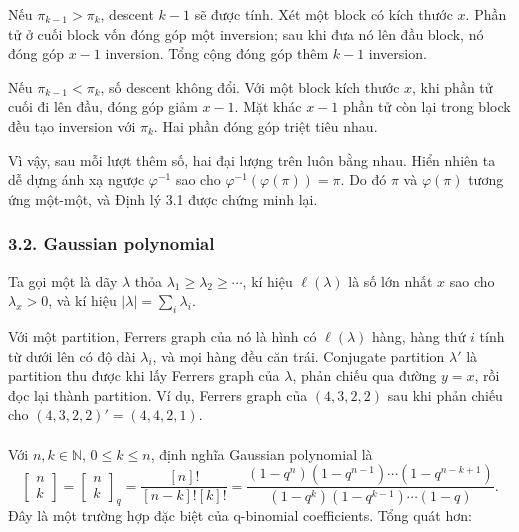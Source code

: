\documentclass[11pt]{article}
\begin{document}
Nếu \(\pi_{k-1}>\pi_k\), descent \(k-1\) sẽ được tính. Xét một block có kích
thước \(x\). Phần tử ở cuối block vốn đóng góp một inversion; sau khi đưa nó
lên đầu block, nó đóng góp \(x-1\) inversion. Tổng cộng đóng góp thêm
\(k-1\) inversion.

Nếu \(\pi_{k-1}<\pi_k\), số descent không đổi. Với một block kích thước \(x\),
khi phần tử cuối đi lên đầu, đóng góp giảm \(x-1\). Mặt khác \(x-1\) phần tử
còn lại trong block đều tạo inversion với \(\pi_k\). Hai phần đóng góp triệt
tiêu nhau.

Vì vậy, sau mỗi lượt thêm số, hai đại lượng trên luôn bằng nhau. Hiển nhiên
ta dễ dựng ánh xạ ngược \(\varphi^{-1}\) sao cho
\(\varphi^{-1}(\varphi(\pi))=\pi\). Do đó \(\pi\) và \(\varphi(\pi)\) tương
ứng một-một, và Định lý 3.1 được chứng minh lại.

\subsubsection*{3.2. Gaussian polynomial}

Ta gọi một  là dãy \(\lambda\) thỏa
\(\lambda_1\ge\lambda_2\ge\cdots\), kí hiệu \(\ell(\lambda)\) là số lớn nhất
\(x\) sao cho \(\lambda_x>0\), và kí hiệu
\(|\lambda|=\sum_i\lambda_i\).

Với một partition, Ferrers graph của nó là hình có \(\ell(\lambda)\) hàng, hàng
thứ \(i\) tính từ dưới lên có độ dài \(\lambda_i\), và mọi hàng đều căn trái.
Conjugate partition \(\lambda'\) là partition thu được khi lấy Ferrers graph
của \(\lambda\), phản chiếu qua đường \(y=x\), rồi đọc lại thành partition.
Ví dụ, Ferrers graph của \((4,3,2,2)\) sau khi phản chiếu cho
\((4,3,2,2)'=(4,4,2,1)\).


\paragraph{}
Với \(n,k\in\mathbb N\), \(0\le k\le n\), định nghĩa Gaussian polynomial là
\[
  \left[\begin{matrix} n\\ k \end{matrix}\right]
  =\left[\begin{matrix} n\\ k \end{matrix}\right]_q
  =\frac{[n]!}{[n-k]![k]!}
  =\frac{(1-q^n)(1-q^{n-1})\cdots(1-q^{n-k+1})}
         {(1-q^k)(1-q^{k-1})\cdots(1-q)}.
\]
Đây là một trường hợp đặc biệt của q-binomial coefficients. Tổng quát hơn:
\end{document}
